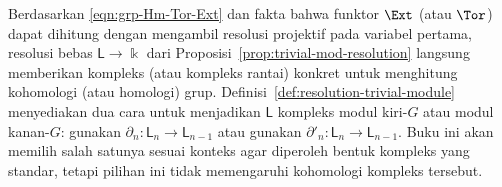 Berdasarkan \eqref{eqn:grp-Hm-Tor-Ext} dan fakta bahwa funktor $\Ext$ (atau
$\Tor$) dapat dihitung dengan mengambil resolusi projektif pada variabel
pertama, resolusi bebas $\mathsf{L}\to\Bbbk$ dari
Proposisi~\ref{prop:trivial-mod-resolution} langsung memberikan kompleks
(atau kompleks rantai) konkret untuk menghitung kohomologi (atau homologi)
grup. Definisi~\ref{def:resolution-trivial-module} menyediakan dua cara untuk
menjadikan $\mathsf{L}$ kompleks modul kiri-$G$ atau modul kanan-$G$: gunakan
$\partial_n:\mathsf{L}_n\to\mathsf{L}_{n-1}$ atau gunakan
	$\partial'_n:\mathsf{L}_n\to\mathsf{L}_{n-1}$. Buku ini akan memilih salah
	satunya sesuai konteks agar diperoleh bentuk kompleks yang standar,
tetapi pilihan ini tidak memengaruhi kohomologi kompleks tersebut.

